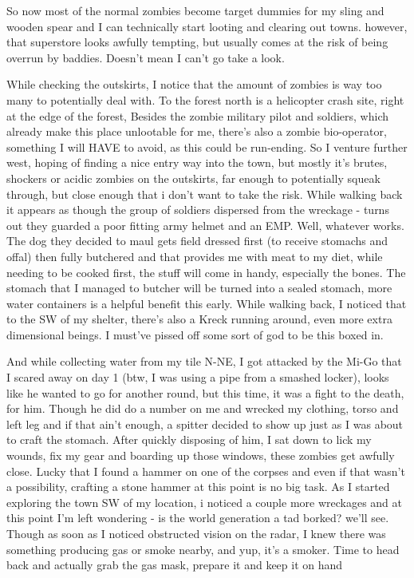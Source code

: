 \documentclass[11pt]{report}
\begin{document}
So now most of the normal zombies become target dummies for my sling and wooden spear and I can technically start looting and clearing out towns. however, that superstore looks awfully tempting, but usually comes at the risk of being overrun by baddies. Doesn't mean I can't go take a look.

While checking the outskirts, I notice that the amount of zombies is way too many to potentially deal with. To the forest north is a helicopter crash site, right at the edge of the forest, Besides the zombie military pilot and soldiers, which already make this place unlootable for me, there's also a zombie bio-operator, something I will HAVE to avoid, as this could be run-ending.
So I venture further west, hoping of finding a nice entry way into the town, but mostly it's brutes, shockers or acidic zombies on the outskirts, far enough to potentially squeak through, but close enough that i don't want to take the risk. While walking back it appears as though the group of soldiers dispersed from the wreckage - turns out they guarded a poor fitting army helmet and an EMP. Well, whatever works. The dog they decided to maul gets field dressed first (to receive stomachs and offal) then fully butchered and that provides me with meat to my diet, while needing to be cooked first, the stuff will come in handy, especially the bones. The stomach that I managed to butcher will be turned into a sealed stomach, more water containers is a helpful benefit this early. While walking back, I noticed that to the SW of my shelter, there's also a Kreck running around, even more extra dimensional beings. I must've pissed off some sort of god to be this boxed in.

And while collecting water from my tile N-NE, I got attacked by the Mi-Go that I scared away on day 1 (btw, I was using a pipe from a smashed locker), looks like he wanted to go for another round, but this time, it was a fight to the death, for him. Though he did do a number on me and wrecked my clothing, torso and left leg and if that ain't enough, a spitter decided to show up just as I was about to craft the stomach. After quickly disposing of him, I sat down to lick my wounds, fix my gear and boarding up those windows, these zombies get awfully close.
Lucky that I found a hammer on one of the corpses and even if that wasn't a possibility, crafting a stone hammer at this point is no big task. As I started exploring the town SW of my location, i noticed a couple more wreckages and at this point I'm left wondering - is the world generation a tad borked? we'll see. Though as soon as I noticed obstructed vision on the radar, I knew there was something producing gas or smoke nearby, and yup, it's a smoker. Time to head back and actually grab the gas mask, prepare it and keep it on hand
\end{document}
